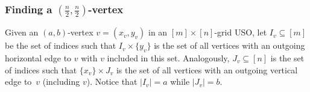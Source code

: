 \documentclass[runningheads,a4paper]{llncs}
\begin{document}
% 
% 

\subsubsection{Finding a $(\frac{n}{2}, \frac{n}{2})$-vertex}

Given an $(a, b)$-vertex $v = (x_v, y_v)$ in an $[m]\times [n]$-grid USO, let $I_v\subseteq [m]$ be the set of indices such that  $I_v \times \{y_v\}$ is the set of all vertices with an outgoing horizontal edge to $v$ with $v$ included in this set. Analogously, $J_v\subseteq [n]$ is the set of indices such that $\{x_v\}\times J_v$ is the set of all vertices with an outgoing vertical edge to~$v$ (including $v$). Notice that $|I_v| = a$ while $|J_v| = b$.
\end{document}
